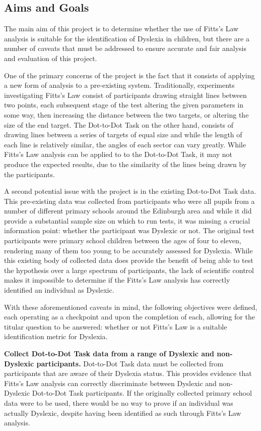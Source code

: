 		\subsection{Aims and Goals}
			The main aim of this project is to determine whether the use of Fitts’s Law analysis is  suitable for the identification of Dyslexia in children, but there are a number of caveats that must be addressed to ensure accurate and fair analysis and evaluation of this project. 
		
			One of the primary concerns of the project is the fact that it consists of applying a new form of analysis to a pre-existing system. Traditionally, experiments investigating Fitts’s Law consist of participants drawing straight lines between two points, each subsequent stage of the test altering the given parameters in some way, then increasing the distance between the two targets, or altering the size of the end target. The Dot-to-Dot Task on the other hand, consists of drawing lines between a series of targets of equal size and while the length of each line is relatively similar, the angles of each sector can vary greatly. While Fitts’s Law analysis can be applied to to the Dot-to-Dot Task, it may not produce the expected results, due to the similarity of the lines being drawn by the participants.
		
			A second potential issue with the project is in the existing Dot-to-Dot Task data. This pre-existing data was collected from participants who were all pupils from a number of different primary schools around the Edinburgh area and while it did provide a substantial sample size on which to run tests, it was missing a crucial information point: whether the participant was Dyslexic or not. The original test participants were primary school children between the ages of four to eleven, rendering many of them too young to be accurately assessed for Dyslexia. While this existing body of collected data does provide the benefit of being able to test the hypothesis over a large spectrum of participants, the lack of scientific control makes it impossible to determine if the Fitts’s Law analysis has correctly identified an individual as Dyslexic.
		
			With these aforementioned caveats in mind, the following objectives were defined, each operating as a checkpoint and upon the completion of each, allowing for the titular question to be answered: whether or not Fitts’s Law is a suitable identification metric for Dyslexia.
		
			\textbf{Collect Dot-to-Dot Task data from a range of Dyslexic and non-Dyslexic participants.
			}Dot-to-Dot Task data must be collected from participants that are aware of their Dyslexia status. This provides evidence that Fitts’s Law analysis can correctly discriminate between Dyslexic and non-Dyslexic Dot-to-Dot Task participants. If the originally collected primary school data were to be used, there would be no way to prove if an individual was actually Dyslexic, despite having been identified as such through Fitts’s Law analysis.
			
